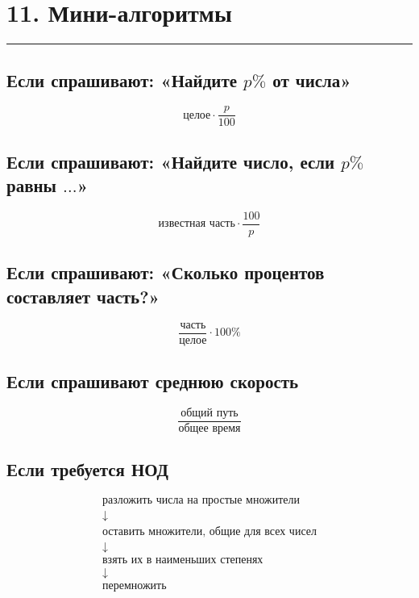 \documentclass[a4paper,12pt]{article}
\newcommand{\sectionline}{%
    \vspace{0.2em}
    {\color{accent}\rule{\linewidth}{0.6pt}}
    \vspace{0.5em}
}
\begin{document}
\section*{\color{darkaccent}11. Мини-алгоритмы}
\sectionline

\subsection*{\color{accent}Если спрашивают: «Найдите \(p\%\) от числа»}

\[
\boxed{
\text{целое}\cdot\frac{p}{100}
}
\]

\subsection*{\color{accent}Если спрашивают: «Найдите число, если \(p\%\) равны \(\ldots\)»}

\[
\boxed{
\text{известная часть}\cdot\frac{100}{p}
}
\]

\subsection*{\color{accent}Если спрашивают: «Сколько процентов составляет часть?»}

\[
\boxed{
\frac{\text{часть}}{\text{целое}}\cdot100\%
}
\]

\subsection*{\color{accent}Если спрашивают среднюю скорость}

\[
\boxed{
\frac{\text{общий путь}}{\text{общее время}}
}
\]

\subsection*{\color{accent}Если требуется НОД}

\[
\boxed{
\begin{array}{c}
\text{разложить числа на простые множители}\\[1mm]
\downarrow\\[1mm]
\text{оставить множители, общие для всех чисел}\\[1mm]
\downarrow\\[1mm]
\text{взять их в наименьших степенях}\\[1mm]
\downarrow\\[1mm]
\text{перемножить}
\end{array}
}
\]
\end{document}
